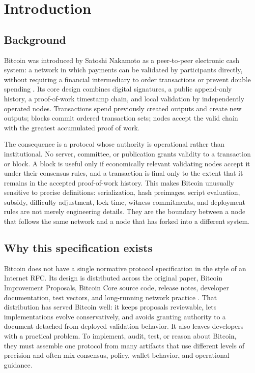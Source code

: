 \section{Introduction}
\label{sec:introduction}

\subsection{Background}

Bitcoin was introduced by Satoshi Nakamoto as a peer-to-peer electronic cash
system: a network in which payments can be validated by participants directly,
without requiring a financial intermediary to order transactions or prevent
double spending \cite{nakamoto-bitcoin}. Its core design combines digital
signatures, a public append-only history, a proof-of-work timestamp chain, and
local validation by independently operated nodes. Transactions spend previously
created outputs and create new outputs; blocks commit ordered transaction sets;
nodes accept the valid chain with the greatest accumulated proof of work.

The consequence is a protocol whose authority is operational rather than
institutional. No server, committee, or publication grants validity to a
transaction or block. A block is useful only if economically relevant validating
nodes accept it under their consensus rules, and a transaction is final only to
the extent that it remains in the accepted proof-of-work history. This makes
Bitcoin unusually sensitive to precise definitions: serialization, hash
preimages, script evaluation, subsidy, difficulty adjustment, lock-time,
witness commitments, and deployment rules are not merely engineering details.
They are the boundary between a node that follows the same network and a node
that has forked into a different system.

\subsection{Why this specification exists}

Bitcoin does not have a single normative protocol specification in the style of
an Internet RFC. Its design is distributed across the original paper,
Bitcoin Improvement Proposals, Bitcoin Core source code, release notes,
developer documentation, test vectors, and long-running network practice
\cite{bitcoin-bips-repo,bitcoin-core,bitcoin-core-v31,bitcoin-developer-reference}.
That distribution has served Bitcoin well: it keeps proposals reviewable, lets
implementations evolve conservatively, and avoids granting authority to a
document detached from deployed validation behavior. It also leaves developers
with a practical problem. To implement, audit, test, or reason about Bitcoin,
they must assemble one protocol from many artifacts that use different levels
of precision and often mix consensus, policy, wallet behavior, and operational
guidance.

